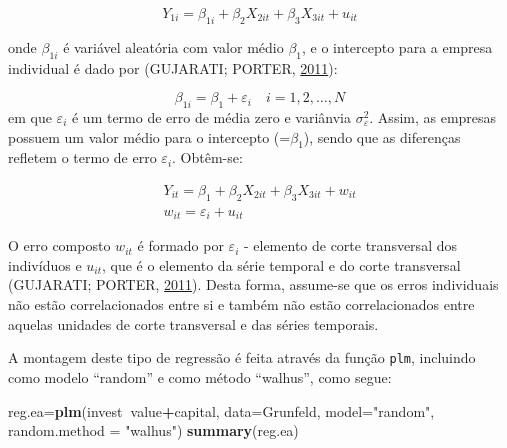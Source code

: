 \documentclass[12pt,brazil,oneside]{book}
\newenvironment{Shaded}{\begin{snugshade}}{\end{snugshade}}
\newcommand{\DataTypeTok}[1]{\textcolor[rgb]{0.13,0.29,0.53}{#1}}
\newcommand{\KeywordTok}[1]{\textcolor[rgb]{0.13,0.29,0.53}{\textbf{#1}}}
\newcommand{\NormalTok}[1]{#1}
\newcommand{\OperatorTok}[1]{\textcolor[rgb]{0.81,0.36,0.00}{\textbf{#1}}}
\newcommand{\StringTok}[1]{\textcolor[rgb]{0.31,0.60,0.02}{#1}}
\begin{document}
\[
Y_{1i}=\beta_{1i}+\beta_2X_{2it}+\beta_3X_{3it}+u_{it}
\]

onde \(\beta_{1i}\) é variável aleatória com valor médio \(\beta_1\), e o intercepto para a empresa individual é dado por (GUJARATI; PORTER, \protect\hyperlink{ref-Gujarati2011}{2011}):

\[
\beta_{1i} = \beta_{1}+\varepsilon_{i} \quad i=1,2,\dots,N
\]
em que \(\varepsilon_{i}\) é um termo de erro de média zero e variânvia \(\sigma^{2}_{\varepsilon}\). Assim, as empresas possuem um valor médio para o intercepto (=\(\beta_1\)), sendo que as diferenças refletem o termo de erro \(\varepsilon_i\). Obtêm-se:

\[
 \begin{matrix}
Y_{it}=\beta_1+\beta_2X_{2it}+\beta_3X_{3it}+ w_{it}\\
w_{it}=\varepsilon_i+u_{it}
 \end{matrix}
\]

O erro composto \(w_{it}\) é formado por \(\varepsilon_i\) - elemento de corte transversal dos indivíduos e \(u_{it}\), que é o elemento da série temporal e do corte transversal (GUJARATI; PORTER, \protect\hyperlink{ref-Gujarati2011}{2011}). Desta forma, assume-se que os erros individuais não estão correlacionados entre si e também não estão correlacionados entre aquelas unidades de corte transversal e das séries temporais.

A montagem deste tipo de regressão é feita através da função \texttt{plm}, incluindo como modelo ``random'' e como método ``walhus'', como segue:

\begin{Shaded}
\begin{Highlighting}[]
\NormalTok{reg.ea=}\KeywordTok{plm}\NormalTok{(invest}\OperatorTok{~}\NormalTok{value}\OperatorTok{+}\NormalTok{capital,}
           \DataTypeTok{data=}\NormalTok{Grunfeld, }\DataTypeTok{model=}\StringTok{"random"}\NormalTok{, }
           \DataTypeTok{random.method =} \StringTok{"walhus"}\NormalTok{)}
\KeywordTok{summary}\NormalTok{(reg.ea)}
\end{Highlighting}
\end{Shaded}
\end{document}

